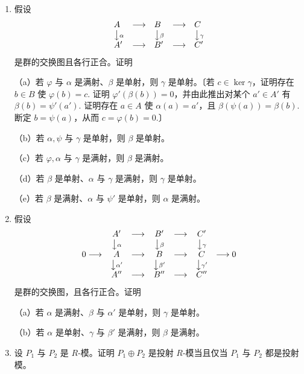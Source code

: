 \begin{enumerate}
\item 假设
\[
\begin{array}{lllllll}
& A & \longrightarrow & B & \longrightarrow & C & \\
& \big\downarrow{\scriptstyle\alpha} & & \big\downarrow{\scriptstyle\beta} & & \big\downarrow{\scriptstyle\gamma} & \\
& A' & \longrightarrow & B' & \longrightarrow & C' &
\end{array}
\]
是群的交换图且各行正合。证明

（a）若 \(\varphi\) 与 \(\alpha\) 是满射、\(\beta\) 是单射，则 \(\gamma\) 是单射。〔若 \(c \in \ker\gamma\)，证明存在 \(b \in B\) 使 \(\varphi(b) = c\). 证明 \(\varphi'(\beta(b)) = 0\)，并由此推出对某个 \(a' \in A'\) 有 \(\beta(b) = \psi'(a')\). 证明存在 \(a \in A\) 使 \(\alpha(a) = a'\)，且 \(\beta(\psi(a)) = \beta(b)\). 断定 \(b = \psi(a)\)，从而 \(c = \varphi(b) = 0\).〕

（b）若 \(\alpha, \psi\) 与 \(\gamma\) 是单射，则 \(\beta\) 是单射。

（c）若 \(\varphi, \alpha\) 与 \(\gamma\) 是满射，则 \(\beta\) 是满射。

（d）若 \(\beta\) 是单射、\(\alpha\) 与 \(\gamma\) 是满射，则 \(\gamma\) 是单射。

（e）若 \(\beta\) 是满射、\(\alpha\) 与 \(\psi'\) 是单射，则 \(\alpha\) 是满射。

\item 假设
\[
\begin{array}{ccccccc}
& A' & \longrightarrow & B' & \longrightarrow & C' & \\
& \big\downarrow{\scriptstyle\alpha} & & \big\downarrow{\scriptstyle\beta} & & \big\downarrow{\scriptstyle\gamma} & \\
0 \longrightarrow & A & \longrightarrow & B & \longrightarrow & C & \longrightarrow 0\\
& \big\downarrow{\scriptstyle\alpha'} & & \big\downarrow{\scriptstyle\beta'} & & \big\downarrow{\scriptstyle\gamma'} & \\
& A'' & \longrightarrow & B'' & \longrightarrow & C'' &
\end{array}
\]
是群的交换图，且各行正合。证明

（a）若 \(\alpha\) 是满射、\(\beta\) 与 \(\alpha'\) 是单射，则 \(\gamma\) 是单射。

（b）若 \(\alpha\) 是单射、\(\gamma\) 与 \(\beta'\) 是满射，则 \(\beta\) 是满射。

\item 设 \(P_1\) 与 \(P_2\) 是 \(R\)-模。证明 \(P_1 \oplus P_2\) 是投射 \(R\)-模当且仅当 \(P_1\) 与 \(P_2\) 都是投射模。


\end{enumerate}
